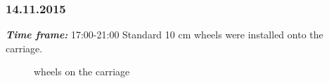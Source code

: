 \subsubsection{14.11.2015}
\textit{\textbf{Time frame:}} 17:00-21:00 \newline
Standard 10 cm wheels were installed onto the carriage.

\begin{figure}[H]
	\begin{minipage}[h]{1\linewidth}
		\caption{wheels on the carriage}
	\end{minipage}
\end{figure}
